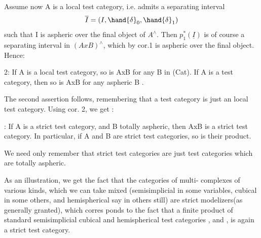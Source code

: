 
Assume now A is a local test category, i.e. admits a separating
interval
\[ \overline{I} = (I,\hand{\delta}_0,\hand{\delta}_1) \]
such that I is aspheric over the final object of $A^\wedge$. Then $p_1^*(\underline{I})$ is of
course a separating interval in $(AxB)^\wedge$, which by cor.1 is aspheric over
the final object. Hence:

\hand{\uline{\textcolor{black}{Proposition}}} 2: If A is a local test category, so is AxB for any B in
(Cat). If A is a test category, then so is AxB for any aspheric B .

The second assertion follows, remembering that a test category is
just an \hand{\uline{\textcolor{black}{aspheric}}} local test category. Using cor. 2, we get :

: If A is a strict test category, and B totally aspheric,
then AxB is a strict test category. In particular, if A and B are
strict test categories, so is their product.

We need only remember that strict test categories are just test
categories which are totally aspheric.

As an illustration, we get the fact that the categories of multi-%
complexes of various kinds, which we can  take mixed (semisimplicial
in some variables, cubical in some others, and hemispherical say in
others still) are strict modelizers(as generally granted), which corres
\hand{-}ponds to the fact that a  finite product of  standard semisimplicial
cubical and hemispherical test categories \hand{$\Delta$} , \hand{$\Box$} and \hand{\unsure{$\bigcirc$}} , is again a
strict test category.

